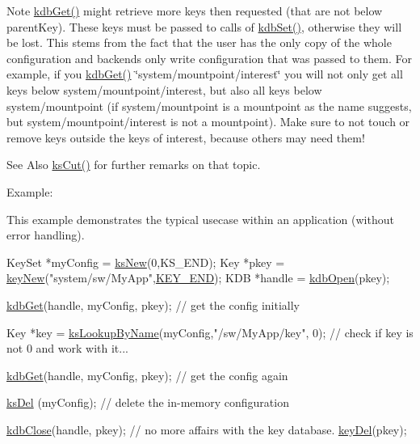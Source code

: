 \begin{DoxyNote}{Note}
\hyperlink{group__kdb_ga28e385fd9cb7ccfe0b2f1ed2f62453a1}{kdb\-Get()} might retrieve more keys then requested (that are not below parent\-Key). These keys must be passed to calls of \hyperlink{group__kdb_ga11436b058408f83d303ca5e996832bcf}{kdb\-Set()}, otherwise they will be lost. This stems from the fact that the user has the only copy of the whole configuration and backends only write configuration that was passed to them. For example, if you \hyperlink{group__kdb_ga28e385fd9cb7ccfe0b2f1ed2f62453a1}{kdb\-Get()} \char`\"{}system/mountpoint/interest\char`\"{} you will not only get all keys below system/mountpoint/interest, but also all keys below system/mountpoint (if system/mountpoint is a mountpoint as the name suggests, but system/mountpoint/interest is not a mountpoint). Make sure to not touch or remove keys outside the keys of interest, because others may need them!
\end{DoxyNote}
\begin{DoxySeeAlso}{See Also}
\hyperlink{group__keyset_ga6b00cf82b59af4d883a9bad6cf4a4a4a}{ks\-Cut()} for further remarks on that topic.
\end{DoxySeeAlso}
\begin{DoxyParagraph}{Example\-:}

\end{DoxyParagraph}
This example demonstrates the typical usecase within an application (without error handling).


\begin{DoxyCode}
KeySet *myConfig = \hyperlink{group__keyset_ga671e1aaee3ae9dc13b4834a4ddbd2c3c}{ksNew}(0,KS\_END);
Key *pkey = \hyperlink{group__key_gad23c65b44bf48d773759e1f9a4d43b89}{keyNew}(\textcolor{stringliteral}{"system/sw/MyApp"},\hyperlink{group__key_gga91fb3178848bd682000958089abbaf40aa8adb6fcb92dec58fb19410eacfdd403}{KEY\_END});
KDB *handle = \hyperlink{group__kdb_ga6808defe5870f328dd17910aacbdc6ca}{kdbOpen}(pkey);

\hyperlink{group__kdb_ga28e385fd9cb7ccfe0b2f1ed2f62453a1}{kdbGet}(handle, myConfig, pkey); \textcolor{comment}{// get the config initially}

Key *key = \hyperlink{group__keyset_gad2e30fb6d4739d917c5abb2ac2f9c1a1}{ksLookupByName}(myConfig,\textcolor{stringliteral}{"/sw/MyApp/key"}, 0);
\textcolor{comment}{// check if key is not 0 and work with it...}

\hyperlink{group__kdb_ga28e385fd9cb7ccfe0b2f1ed2f62453a1}{kdbGet}(handle, myConfig, pkey); \textcolor{comment}{// get the config again}

\hyperlink{group__keyset_ga27e5c16473b02a422238c8d970db7ac8}{ksDel} (myConfig); \textcolor{comment}{// delete the in-memory configuration}

\hyperlink{group__kdb_gadb54dc9fda17ee07deb9444df745c96f}{kdbClose}(handle, pkey); \textcolor{comment}{// no more affairs with the key database.}
\hyperlink{group__key_ga3df95bbc2494e3e6703ece5639be5bb1}{keyDel}(pkey);
\end{DoxyCode}


